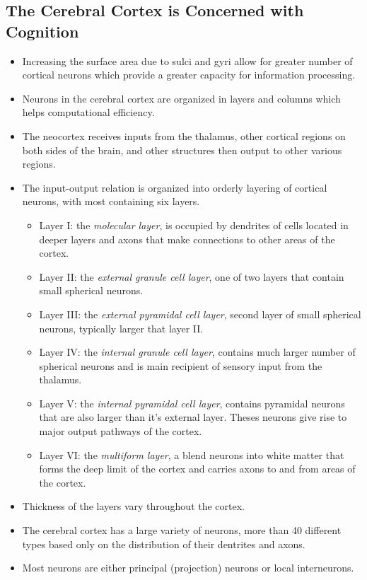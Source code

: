 \documentclass[12pt,a4paper]{article}
\begin{document}
\subsection{The Cerebral Cortex is Concerned with Cognition}
\begin{itemize}
    \item Increasing the surface area due to sulci and gyri allow for greater number of cortical neurons which provide a greater capacity for information processing.
    \item Neurons in the cerebral cortex are organized in layers and columns which helps computational efficiency.
    \item The neocortex receives inputs from the thalamus, other cortical regions on both sides of the brain, and other structures then output to other various regions.
    \item The input-output relation is organized into orderly layering of cortical neurons, with most containing six layers.
        \begin{itemize}
            \item Layer I: the \textit{molecular layer}, is occupied by dendrites of cells located in deeper layers and axons that make connections to other areas of the cortex.
            \item Layer II: the \textit{external granule cell layer}, one of two layers that contain small spherical neurons.
            \item Layer III: the \textit{external pyramidal cell layer}, second layer of small spherical neurons, typically larger that layer II.
            \item Layer IV: the \textit{internal granule cell layer}, contains much larger number of spherical neurons and is main recipient of sensory input from the thalamus.
            \item Layer V: the \textit{internal pyramidal cell layer}, contains pyramidal neurons that are also larger than it's external layer. Theses neurons give rise to major output pathways of the cortex.
            \item Layer VI: the \textit{multiform layer}, a blend neurons into white matter that forms the deep limit of the cortex and carries axons to and from areas of the cortex.
        \end{itemize}
    \item Thickness of the layers vary throughout the cortex.
    \item The cerebral cortex has a large variety of neurons, more than 40 different types based only on the distribution of their dentrites and axons.
    \item Most neurons are either principal (projection) neurons or local interneurons.
\end{itemize}
\end{document}

